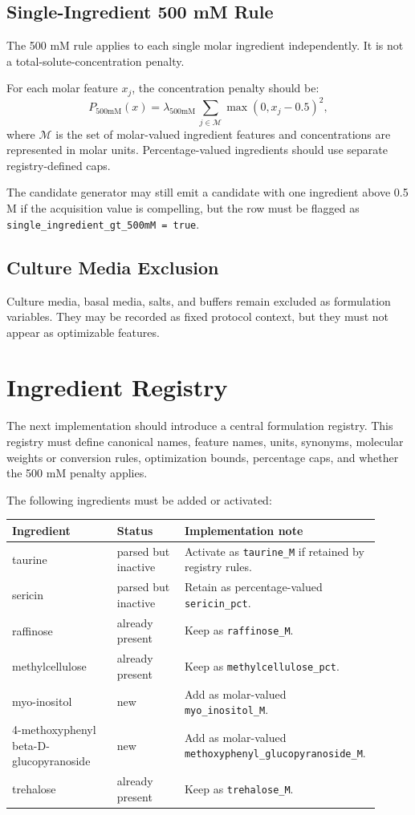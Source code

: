 \documentclass[11pt]{article}
\newcommand{\metric}[1]{\texttt{#1}}
\begin{document}
\subsection{Single-Ingredient 500 mM Rule}

The 500 mM rule applies to each single molar ingredient independently. It is not a
total-solute-concentration penalty.

For each molar feature $x_j$, the concentration penalty should be:
\[
P_{\mathrm{500mM}}(x)
= \lambda_{\mathrm{500mM}}\,
\sum_{j \in \mathcal{M}}
\max(0, x_j - 0.5)^2,
\]
where $\mathcal{M}$ is the set of molar-valued ingredient features and concentrations
are represented in molar units. Percentage-valued ingredients should use separate
registry-defined caps.

The candidate generator may still emit a candidate with one ingredient above 0.5 M if
the acquisition value is compelling, but the row must be flagged as
\metric{single\_ingredient\_gt\_500mM = true}.

\subsection{Culture Media Exclusion}

Culture media, basal media, salts, and buffers remain excluded as formulation variables.
They may be recorded as fixed protocol context, but they must not appear as optimizable
features.

\section{Ingredient Registry}

The next implementation should introduce a central formulation registry. This registry
must define canonical names, feature names, units, synonyms, molecular weights or
conversion rules, optimization bounds, percentage caps, and whether the 500 mM penalty
applies.

The following ingredients must be added or activated:
\begin{longtable}{@{}p{0.28\linewidth}p{0.18\linewidth}p{0.45\linewidth}@{}}
\toprule
\textbf{Ingredient} & \textbf{Status} & \textbf{Implementation note} \\
\midrule
taurine & parsed but inactive & Activate as \metric{taurine\_M} if retained by registry rules. \\
sericin & parsed but inactive & Retain as percentage-valued \metric{sericin\_pct}. \\
raffinose & already present & Keep as \metric{raffinose\_M}. \\
methylcellulose & already present & Keep as \metric{methylcellulose\_pct}. \\
myo-inositol & new & Add as molar-valued \metric{myo\_inositol\_M}. \\
4-methoxyphenyl beta-D-glucopyranoside & new & Add as molar-valued \metric{methoxyphenyl\_glucopyranoside\_M}. \\
trehalose & already present & Keep as \metric{trehalose\_M}. \\
\bottomrule
\end{longtable}
\end{document}
